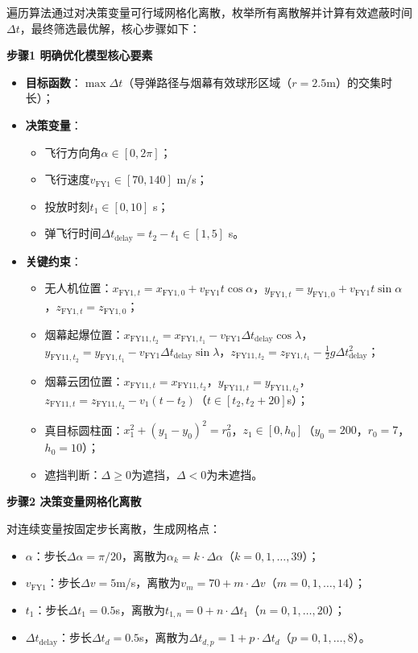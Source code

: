 \documentclass[../main.tex]{subfiles}
\begin{document}

遍历算法通过对决策变量可行域网格化离散，枚举所有离散解并计算有效遮蔽时间$\Delta t$，最终筛选最优解，核心步骤如下：

\noindent\textbf{步骤1 明确优化模型核心要素}
\begin{itemize}
    \item \textbf{目标函数}：$\max \Delta t$（导弹路径与烟幕有效球形区域（$r=2.5$m）的交集时长）；
    \item \textbf{决策变量}：
          \begin{itemize}
              \item 飞行方向角$\alpha \in [0,2\pi]$；
              \item 飞行速度$v_{\text{FY1}} \in [70,140]$ m/s；
              \item 投放时刻$t_1 \in [0,10]$ s；
              \item 弹飞行时间$\Delta t_{\text{delay}}=t_2-t_1 \in [1,5]$ s。
          \end{itemize}
    \item \textbf{关键约束}：
          \begin{itemize}
              \item 无人机位置：$x_{\text{FY1},t}=x_{\text{FY1},0}+v_{\text{FY1}}t\cos\alpha$，$y_{\text{FY1},t}=y_{\text{FY1},0}+v_{\text{FY1}}t\sin\alpha$，$z_{\text{FY1},t}=z_{\text{FY1},0}$；
              \item 烟幕起爆位置：$x_{\text{FY11},t_2}=x_{\text{FY1},t_1}-v_{\text{FY1}}\Delta t_{\text{delay}}\cos\lambda$，$y_{\text{FY11},t_2}=y_{\text{FY1},t_1}-v_{\text{FY1}}\Delta t_{\text{delay}}\sin\lambda$，$z_{\text{FY11},t_2}=z_{\text{FY1},t_1}-\frac{1}{2}g\Delta t_{\text{delay}}^2$；
              \item 烟幕云团位置：$x_{\text{FY11},t}=x_{\text{FY11},t_2}$，$y_{\text{FY11},t}=y_{\text{FY11},t_2}$，$z_{\text{FY11},t}=z_{\text{FY11},t_2}-v_1(t-t_2)$（$t \in [t_2,t_2+20]$s）；
              \item 真目标圆柱面：$x_1^2+(y_1-y_0)^2=r_0^2$，$z_1 \in [0,h_0]$（$y_0=200$，$r_0=7$，$h_0=10$）；
              \item 遮挡判断：$\Delta \geq 0$为遮挡，$\Delta <0$为未遮挡。
          \end{itemize}
\end{itemize}

\noindent\textbf{步骤2 决策变量网格化离散}

对连续变量按固定步长离散，生成网格点：
\begin{itemize}
    \item $\alpha$：步长$\Delta\alpha=\pi/20$，离散为$\alpha_k=k\cdot\Delta\alpha$（$k=0,1,\dots,39$）；
    \item $v_{\text{FY1}}$：步长$\Delta v=5$m/s，离散为$v_m=70+m\cdot\Delta v$（$m=0,1,\dots,14$）；
    \item $t_1$：步长$\Delta t_1=0.5$s，离散为$t_{1,n}=0+n\cdot\Delta t_1$（$n=0,1,\dots,20$）；
    \item $\Delta t_{\text{delay}}$：步长$\Delta t_d=0.5$s，离散为$\Delta t_{d,p}=1+p\cdot\Delta t_d$（$p=0,1,\dots,8$）。
\end{itemize}
\end{document}
